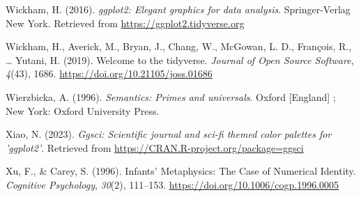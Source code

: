 \documentclass[
  man,floatsintext]{apa6}
\newlength{\cslhangindent}
\newenvironment{CSLReferences}[2] %
 {\begin{list}{}{%
  \setlength{\itemindent}{0pt}
  \setlength{\leftmargin}{0pt}
  \setlength{\parsep}{0pt}
  \ifodd #1
   \setlength{\leftmargin}{\cslhangindent}
   \setlength{\itemindent}{-1\cslhangindent}
  \fi
  \setlength{\itemsep}{#2\baselineskip}}}
 {\end{list}}
\begin{document}
\begin{CSLReferences}{1}{0}
Wickham, H. (2016). \emph{ggplot2: Elegant graphics for data analysis}. Springer-Verlag New York. Retrieved from \url{https://ggplot2.tidyverse.org}

Wickham, H., Averick, M., Bryan, J., Chang, W., McGowan, L. D., François, R., \ldots{} Yutani, H. (2019). Welcome to the {tidyverse}. \emph{Journal of Open Source Software}, \emph{4}(43), 1686. \url{https://doi.org/10.21105/joss.01686}

Wierzbicka, A. (1996). \emph{Semantics: Primes and universals}. Oxford {[}England{]} ; New York: Oxford University Press.

Xiao, N. (2023). \emph{Ggsci: Scientific journal and sci-fi themed color palettes for 'ggplot2'}. Retrieved from \url{https://CRAN.R-project.org/package=ggsci}

Xu, F., \& Carey, S. (1996). Infants' {Metaphysics}: {The} {Case} of {Numerical} {Identity}. \emph{Cognitive Psychology}, \emph{30}(2), 111--153. \url{https://doi.org/10.1006/cogp.1996.0005}

\end{CSLReferences}

\endgroup
\end{document}
